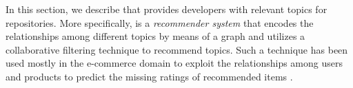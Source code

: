 
In this section, we describe \CT that provides developers with relevant topics for \GH repositories. More specifically, \CT is a \emph{recommender system} \cite{Aggarwal2016} that encodes the relationships among different topics by means of a graph and utilizes a collaborative filtering technique \cite{Schafer:2007:CFR:1768197.1768208} to recommend \GH topics. Such a technique has been used mostly in the e-commerce domain to exploit the relationships among users and products to predict the missing ratings of recommended items \cite{Linden:2003:ARI:642462.642471}. 

